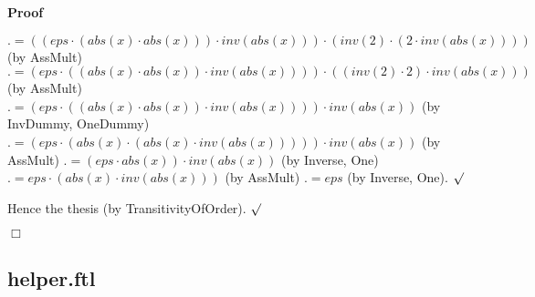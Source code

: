 \documentclass{article}
\newenvironment{forthel}{\begin{leftbar}}{\end{leftbar}}
\newenvironment{proof}{\noindent\textbf{Proof\ }}{\hspace*{\fill}$\Box$\medskip}
\newenvironment{subproof}{\begin{list}{}{}
		\item[\text{Proof}]}{\hfill $\surd$ \end{list}}
\begin{document}
\begin{forthel}
\begin{proof}
\begin{subproof}
\begin{subproof}
	$.= ((eps \cdot (abs(x) \cdot abs(x))) \cdot inv(abs(x))) \cdot (inv(2) \cdot (2 \cdot inv(abs(x))))$ (by AssMult)
	$.= (eps \cdot ((abs(x) \cdot abs(x)) \cdot inv(abs(x)))) \cdot ((inv(2) \cdot 2) \cdot inv(abs(x)))$ (by AssMult)
	$.= (eps \cdot ((abs(x) \cdot abs(x)) \cdot inv(abs(x)))) \cdot inv(abs(x))$ (by InvDummy, OneDummy)
	$.= (eps \cdot (abs(x) \cdot (abs(x) \cdot inv(abs(x))))) \cdot inv(abs(x))$ (by AssMult)
	$.= (eps \cdot abs(x)) \cdot inv(abs(x))$ (by Inverse, One)
	$.= eps \cdot (abs(x) \cdot inv(abs(x)))$ (by AssMult)
	$.= eps$ (by Inverse, One).
	\end{subproof}
	Hence the thesis (by TransitivityOfOrder).
	\end{subproof}
	\end{proof}




\end{forthel}

\subsection{helper.ftl}
\end{document}
